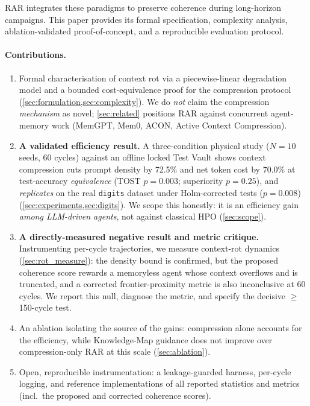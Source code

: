 \documentclass[conference]{IEEEtran}
\begin{document}
RAR integrates these paradigms to preserve coherence during long-horizon campaigns. This paper provides its formal specification, complexity analysis, ablation-validated proof-of-concept, and a reproducible evaluation protocol.

\paragraph{Contributions.}
\begin{enumerate}[label=\textbf{C\arabic*.},leftmargin=2.2em,itemsep=2pt]
  \item Formal characterisation of context rot via a piecewise-linear degradation model and a bounded cost-equivalence proof for the compression protocol (\cref{sec:formulation,sec:complexity}). We do \emph{not} claim the compression \emph{mechanism} as novel; \cref{sec:related} positions RAR against concurrent agent-memory work (MemGPT, Mem0, ACON, Active Context Compression).
  \item \textbf{A validated efficiency result.} A three-condition physical study ($N{=}10$ seeds, 60 cycles) against an offline locked Test Vault shows context compression cuts prompt density by 72.5\% and net token cost by 70.0\% at test-accuracy \emph{equivalence} (TOST $p{=}0.003$; superiority $p{=}0.25$), and \emph{replicates} on the real \texttt{digits} dataset under Holm-corrected tests ($p{=}0.008$) (\cref{sec:experiments,sec:digits}). We scope this honestly: it is an efficiency gain \emph{among LLM-driven agents}, not against classical HPO (\cref{sec:scope}).
  \item \textbf{A directly-measured negative result and metric critique.} Instrumenting per-cycle trajectories, we measure context-rot dynamics (\cref{sec:rot_measure}): the density bound is confirmed, but the proposed coherence score rewards a memoryless agent whose context overflows and is truncated, and a corrected frontier-proximity metric is also inconclusive at 60 cycles. We report this null, diagnose the metric, and specify the decisive $\geq$150-cycle test.
  \item An ablation isolating the source of the gains: compression alone accounts for the efficiency, while Knowledge-Map guidance does not improve over compression-only RAR at this scale (\cref{sec:ablation}).
  \item Open, reproducible instrumentation: a leakage-guarded harness, per-cycle logging, and reference implementations of all reported statistics and metrics (incl.\ the proposed and corrected coherence scores).
\end{enumerate}
\end{document}
